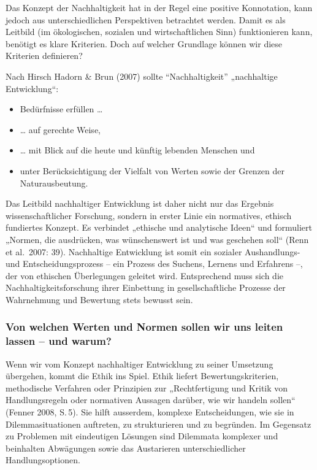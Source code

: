 \documentclass[
  letterpaper,
  DIV=11,
  numbers=noendperiod]{scrartcl}
\providecommand{\tightlist}{%
  \setlength{\itemsep}{0pt}\setlength{\parskip}{0pt}}\usepackage{longtable,booktabs,array}
\begin{document}
Das Konzept der Nachhaltigkeit hat in der Regel eine positive
Konnotation, kann jedoch aus unterschiedlichen Perspektiven betrachtet
werden. Damit es als Leitbild (im ökologischen, sozialen und
wirtschaftlichen Sinn) funktionieren kann, benötigt es klare Kriterien.
Doch auf welcher Grundlage können wir diese Kriterien definieren?

Nach Hirsch Hadorn \& Brun (2007) sollte ``Nachhaltigkeit'' „nachhaltige
Entwicklung``:

\begin{itemize}
\tightlist
\item
  Bedürfnisse erfüllen \ldots{}
\item
  \ldots{} auf gerechte Weise,
\item
  \ldots{} mit Blick auf die heute und künftig lebenden Menschen und
\item
  unter Berücksichtigung der Vielfalt von Werten sowie der Grenzen der
  Naturausbeutung.
\end{itemize}

Das Leitbild nachhaltiger Entwicklung ist daher nicht nur das Ergebnis
wissenschaftlicher Forschung, sondern in erster Linie ein normatives,
ethisch fundiertes Konzept. Es verbindet „ethische und analytische
Ideen`` und formuliert „Normen, die ausdrücken, was wünschenswert ist
und was geschehen soll`` (Renn et al.~2007: 39). Nachhaltige Entwicklung
ist somit ein sozialer Aushandlungs- und Entscheidungsprozess -- ein
Prozess des Suchens, Lernens und Erfahrens --, der von ethischen
Überlegungen geleitet wird. Entsprechend muss sich die
Nachhaltigkeitsforschung ihrer Einbettung in gesellschaftliche Prozesse
der Wahrnehmung und Bewertung stets bewusst sein.

\subsubsection{Von welchen Werten und Normen sollen wir uns leiten
lassen -- und
warum?}\label{von-welchen-werten-und-normen-sollen-wir-uns-leiten-lassen-und-warum}

Wenn wir vom Konzept nachhaltiger Entwicklung zu seiner Umsetzung
übergehen, kommt die Ethik ins Spiel. Ethik liefert Bewertungskriterien,
methodische Verfahren oder Prinzipien zur „Rechtfertigung und Kritik von
Handlungsregeln oder normativen Aussagen darüber, wie wir handeln
sollen`` (Fenner 2008, S.\,5). Sie hilft ausserdem, komplexe
Entscheidungen, wie sie in Dilemmasituationen auftreten, zu
strukturieren und zu begründen. Im Gegensatz zu Problemen mit
eindeutigen Lösungen sind Dilemmata komplexer und beinhalten Abwägungen
sowie das Austarieren unterschiedlicher Handlungsoptionen.
\end{document}
